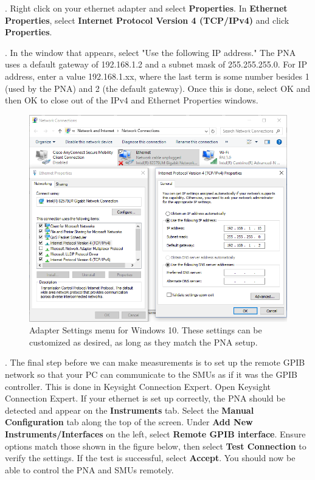 \documentclass[]{article}
\begin{document}
\ex. Right click on your ethernet adapter and select \textbf{Properties}. In \textbf{Ethernet Properties}, select \textbf{Internet Protocol Version 4 (TCP/IPv4)} and click \textbf{Properties}. 

\ex. In the window that appears, select "Use the following IP address." The PNA uses a default gateway of 192.168.1.2 and a subnet mask of 255.255.255.0. For IP address, enter a value 192.168.1.xx, where the last term is some number besides 1 (used by the PNA) and 2 (the default gateway). Once this is done, select OK and then OK to close out of the IPv4 and Ethernet Properties windows.

\begin{figure}[H]
	\centering
	\includegraphics[width=\linewidth]{Figures/network}
	\caption{Adapter Settings menu for Windows 10. These settings can be customized as desired, as long as they match the PNA setup.}
	\label{fig:cp2}
\end{figure}

\ex. The final step before we can make measurements is to set up the remote GPIB network so that your PC can communicate to the SMUs as if it was the GPIB controller. This is done in Keysight Connection Expert. Open Keysight Connection Expert. If your ethernet is set up correctly, the PNA should be detected and appear on the \textbf{Instruments} tab. Select the \textbf{Manual Configuration} tab along the top of the screen. Under \textbf{Add New Instruments/Interfaces} on the left, select \textbf{Remote GPIB interface}. Ensure options match those shown in the figure below, then select \textbf{Test Connection} to verify the settings. If the test is successful, select \textbf{Accept}. You should now be able to control the PNA and SMUs remotely.
\end{document}
